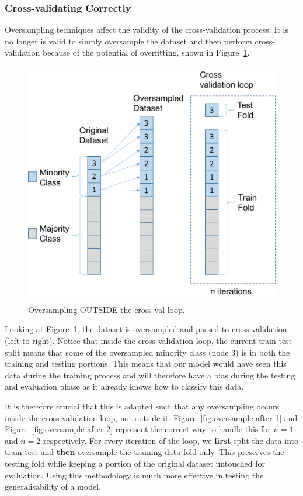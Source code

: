 \documentclass[12pt,a4paper,twoside]{report}
\begin{document}
\subsubsection{Cross-validating Correctly}
Oversampling techniques affect the validity of the cross-validation process. It is no longer is valid to simply oversample the dataset and then perform cross-validation because of the potential of overfitting, shown in Figure~\ref{fig:oversample-before}.

\begin{figure}[!htbp]
\centering
\includegraphics[scale=0.8]{oversample-before}
\caption{Oversampling OUTSIDE the cross-val loop.}
\label{fig:oversample-before}
\end{figure}

Looking at Figure~\ref{fig:oversample-before}, the dataset is oversampled and passed to cross-validation (left-to-right). Notice that inside the cross-validation loop, the current train-test split means that some of the oversampled minority class (node 3) is in both the training and testing portions. This means that our model would have seen this data during the training process and will therefore have a bias during the testing and evaluation phase as it already knows how to classify this data. 

It is therefore crucial that this is adapted such that any oversampling occurs inside the cross-validation loop, not outside it. Figure~\ref{fig:oversample-after-1} and Figure~\ref{fig:oversample-after-2} represent the correct way to handle this for $n=1$ and $n=2$ respectively. For every iteration of the loop, we \textbf{first} split the data into train-test and \textbf{then} oversample the training data fold only. This preserves the testing fold while keeping a portion of the original dataset untouched for evaluation. Using this methodology is much more effective in testing the generalisability of a model.
\end{document}
